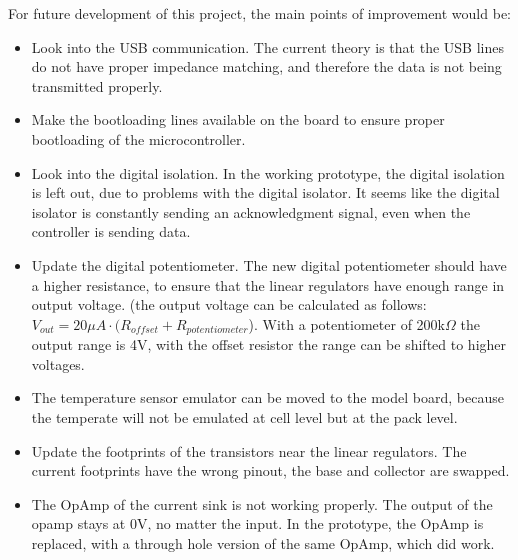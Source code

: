 \IEEEPARstart
{F}{or} future development of this project, the main points of improvement would be:
\begin{itemize}
      \item Look into the USB communication. The current theory is that the USB lines do not have proper impedance matching, and therefore the data is not being transmitted properly.
      \item Make the bootloading lines available on the board to ensure proper bootloading of the microcontroller.
      \item Look into the digital isolation. In the working prototype, the digital isolation is left out, due to problems with the digital isolator. It seems like the digital isolator is constantly sending an acknowledgment signal, even when the controller is sending data.
      \item Update the digital potentiometer. The new digital potentiometer should have a higher resistance, to ensure that the linear regulators have enough range in output voltage. (the output voltage can be calculated as follows: $V_{out} = 20\mu A \cdot (R_{offset}+R_{potentiometer}$). With a potentiometer of 200k$\Omega$ the output range is 4V, with the offset resistor the range can be shifted to higher voltages.
      \item The temperature sensor emulator can be moved to the model board, because the temperate will not be emulated at cell level but at the pack level.
      \item Update the footprints of the transistors near the linear regulators. The current footprints have the wrong pinout, the base and collector are swapped.
      \item The OpAmp of the current sink is not working properly. The output of the opamp stays at 0V, no matter the input. In the prototype, the OpAmp is replaced, with a through hole version of the same OpAmp, which did work. 
\end{itemize}  